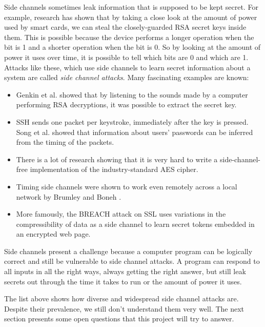 \documentclass{acm_proc_article-sp}
\begin{document}
Side channels sometimes leak information that is supposed to be kept secret. For
example, research \cite{messerges1999power} has shown that by taking a close
look at the amount of power used by smart cards, we can steal the
closely-guarded RSA secret keys inside them. This is possible because the device
performs a longer operation when the bit is 1 and a shorter operation when the
bit is 0. So by looking at the amount of power it uses over time, it is possible
to tell which bits are 0 and which are 1. Attacks like these, which use side
channels to learn secret information about a system are called \emph{side
channel attacks}. Many fascinating examples are known:

\begin{itemize}
\item Genkin et al. \cite{genkin2013rsa} showed that by listening to the sounds
made by a computer performing RSA decryptions, it was possible to extract the
secret key.

\item SSH sends one packet per keystroke, immediately after the key is pressed.
Song et al. \cite{song2001timing} showed that information about users' passwords
can be inferred from the timing of the packets.

\item There is a lot of research \cite{bernstein2005cache, osvik2006cache,
weiss2012cache, aciiccmez2006cache} showing that it is very hard to write
a side-channel-free implementation of the industry-standard AES cipher.

\item Timing side channels were shown to work even remotely across a local
network by Brumley and Boneh \cite{brumley2005remote}.

\item More famously, the BREACH attack on SSL \cite{gluck2013breach} uses
variations in the compressibility of data as a side channel to learn secret
tokens embedded in an encrypted web page.
\end{itemize}

Side channels present a challenge because a computer program can be logically
correct and still be vulnerable to side channel attacks. A program can respond
to all inputs in all the right ways, always getting the right answer, but still
leak secrets out through the time it takes to run or the amount of power it
uses.

The list above shows how diverse and widespread side channel attacks are.
Despite their prevalence, we still don't understand them very well. The next
section presents some open questions that this project will try to answer.
\end{document}
